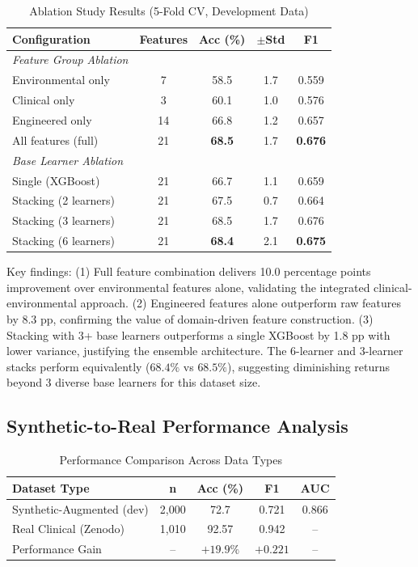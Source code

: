 \documentclass[11pt,a4paper]{article}
\begin{document}
\begin{table}[H]
\centering
\caption{Ablation Study Results (5-Fold CV, Development Data)}
\label{tab:ablation}
\begin{tabular}{lcccc}
\toprule
\textbf{Configuration} & \textbf{Features} & \textbf{Acc (\%)} & \textbf{$\pm$Std} & \textbf{F1} \\
\midrule
\textit{Feature Group Ablation} & & & & \\
Environmental only    & 7  & 58.5 & 1.7 & 0.559 \\
Clinical only         & 3  & 60.1 & 1.0 & 0.576 \\
Engineered only       & 14 & 66.8 & 1.2 & 0.657 \\
All features (full)   & 21 & \textbf{68.5} & 1.7 & \textbf{0.676} \\
\midrule
\textit{Base Learner Ablation} & & & & \\
Single (XGBoost)      & 21 & 66.7 & 1.1 & 0.659 \\
Stacking (2 learners) & 21 & 67.5 & 0.7 & 0.664 \\
Stacking (3 learners) & 21 & 68.5 & 1.7 & 0.676 \\
Stacking (6 learners) & 21 & \textbf{68.4} & 2.1 & \textbf{0.675} \\
\bottomrule
\end{tabular}
\end{table}

Key findings: (1) Full feature combination delivers 10.0 percentage points improvement
over environmental features alone, validating the integrated clinical-environmental
approach. (2) Engineered features alone outperform raw features by 8.3 pp, confirming
the value of domain-driven feature construction. (3) Stacking with 3+ base learners
outperforms a single XGBoost by 1.8 pp with lower variance, justifying the ensemble
architecture. The 6-learner and 3-learner stacks perform equivalently ($68.4\%$ vs
$68.5\%$), suggesting diminishing returns beyond 3 diverse base learners for this
dataset size.

\subsection{Synthetic-to-Real Performance Analysis}

\begin{table}[H]
\centering
\caption{Performance Comparison Across Data Types}
\label{tab:synthetic_real}
\begin{tabular}{lcccc}
\toprule
\textbf{Dataset Type} & \textbf{n} & \textbf{Acc (\%)} & \textbf{F1} & \textbf{AUC} \\
\midrule
Synthetic-Augmented (dev) & 2,000 & 72.7  & 0.721 & 0.866 \\
Real Clinical (Zenodo)    & 1,010 & 92.57 & 0.942 & -- \\
\midrule
Performance Gain          & --    & $+19.9\%$ & $+0.221$ & -- \\
\bottomrule
\end{tabular}
\end{table}
\end{document}
